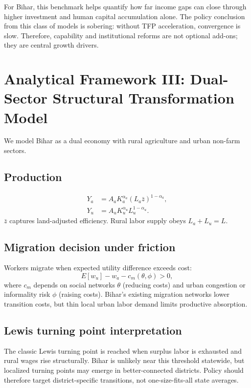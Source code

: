 \documentclass[preprint,12pt]{elsarticle}
\begin{document}
For Bihar, this benchmark helps quantify how far income gaps can close through higher investment and human capital accumulation alone. The policy conclusion from this class of models is sobering: without TFP acceleration, convergence is slow. Therefore, capability and institutional reforms are not optional add-ons; they are central growth drivers.

\section{Analytical Framework III: Dual-Sector Structural Transformation Model}
We model Bihar as a dual economy with rural agriculture and urban non-farm sectors.

\subsection{Production}
\begin{align}
Y_a &= A_a K_a^{\alpha_a}(L_a \bar{z})^{1-\alpha_a},\\
Y_u &= A_u K_u^{\alpha_u}L_u^{1-\alpha_u}.
\end{align}
$\bar{z}$ captures land-adjusted efficiency. Rural labor supply obeys $L_a+L_u=L$.

\subsection{Migration decision under friction}
Workers migrate when expected utility difference exceeds cost:
\begin{equation}
E[w_u] - w_a - c_m(\theta,\phi) > 0,
\end{equation}
where $c_m$ depends on social networks $\theta$ (reducing costs) and urban congestion or informality risk $\phi$ (raising costs). Bihar's existing migration networks lower transition costs, but thin local urban labor demand limits productive absorption.

\subsection{Lewis turning point interpretation}
The classic Lewis turning point is reached when surplus labor is exhausted and rural wages rise structurally. Bihar is unlikely near this threshold statewide, but localized turning points may emerge in better-connected districts. Policy should therefore target district-specific transitions, not one-size-fits-all state averages.
\end{document}
